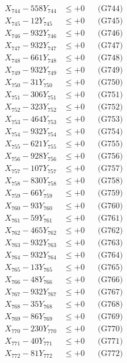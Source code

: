\documentclass[a4paper,10pt]{article}
\begin{document}
{\begin{align}
X_{744} - 558Y_{744} &\leq +0 && \text{(G744)} \\
X_{745} - 12Y_{745} &\leq +0 && \text{(G745)} \\
X_{746} - 932Y_{746} &\leq +0 && \text{(G746)} \\
X_{747} - 932Y_{747} &\leq +0 && \text{(G747)} \\
X_{748} - 661Y_{748} &\leq +0 && \text{(G748)} \\
X_{749} - 932Y_{749} &\leq +0 && \text{(G749)} \\
X_{750} - 31Y_{750} &\leq +0 && \text{(G750)} \\
\allowbreak
X_{751} - 306Y_{751} &\leq +0 && \text{(G751)} \\
X_{752} - 323Y_{752} &\leq +0 && \text{(G752)} \\
X_{753} - 464Y_{753} &\leq +0 && \text{(G753)} \\
X_{754} - 932Y_{754} &\leq +0 && \text{(G754)} \\
X_{755} - 621Y_{755} &\leq +0 && \text{(G755)} \\
X_{756} - 928Y_{756} &\leq +0 && \text{(G756)} \\
X_{757} - 107Y_{757} &\leq +0 && \text{(G757)} \\
X_{758} - 830Y_{758} &\leq +0 && \text{(G758)} \\
X_{759} - 66Y_{759} &\leq +0 && \text{(G759)} \\
X_{760} - 93Y_{760} &\leq +0 && \text{(G760)} \\
\allowbreak
X_{761} - 59Y_{761} &\leq +0 && \text{(G761)} \\
X_{762} - 465Y_{762} &\leq +0 && \text{(G762)} \\
X_{763} - 932Y_{763} &\leq +0 && \text{(G763)} \\
X_{764} - 932Y_{764} &\leq +0 && \text{(G764)} \\
X_{765} - 13Y_{765} &\leq +0 && \text{(G765)} \\
X_{766} - 48Y_{766} &\leq +0 && \text{(G766)} \\
X_{767} - 932Y_{767} &\leq +0 && \text{(G767)} \\
X_{768} - 35Y_{768} &\leq +0 && \text{(G768)} \\
X_{769} - 86Y_{769} &\leq +0 && \text{(G769)} \\
X_{770} - 230Y_{770} &\leq +0 && \text{(G770)} \\
\allowbreak
X_{771} - 40Y_{771} &\leq +0 && \text{(G771)} \\
X_{772} - 81Y_{772} &\leq +0 && \text{(G772)} \\

\end{align}}
\end{document}
